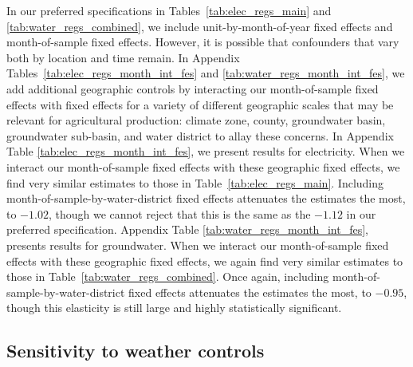 In our preferred specifications in Tables~\ref{tab:elec_regs_main} and \ref{tab:water_regs_combined}, we include unit-by-month-of-year fixed effects and month-of-sample fixed effects. However, it is possible that confounders that vary both by location and time remain. In Appendix Tables~\ref{tab:elec_regs_month_int_fes} and \ref{tab:water_regs_month_int_fes}, we add additional geographic controls by interacting our month-of-sample fixed effects with fixed effects for a variety of different geographic scales that may be relevant for agricultural production: climate zone, county, groundwater basin, groundwater sub-basin, and water district to allay these concerns. 
In Appendix Table \ref{tab:elec_regs_month_int_fes}, we present results for electricity. When we interact our month-of-sample fixed effects with these geographic fixed effects, we find very similar estimates to those in Table~\ref{tab:elec_regs_main}. Including month-of-sample-by-water-district fixed effects attenuates the estimates the most, to $-1.02$, though we cannot reject that this is the same as the $-1.12$ in our preferred specification.  
Appendix Table \ref{tab:water_regs_month_int_fes}, presents results for groundwater. When we interact our month-of-sample fixed effects with these geographic fixed effects, we again find very similar estimates to those in Table~\ref{tab:water_regs_combined}. Once again, including month-of-sample-by-water-district fixed effects attenuates the estimates the most, to $-0.95$, though this elasticity is still large and highly statistically significant.




\FloatBarrier
\subsection{Sensitivity to weather controls}
\label{app:sens_weather_controls}

